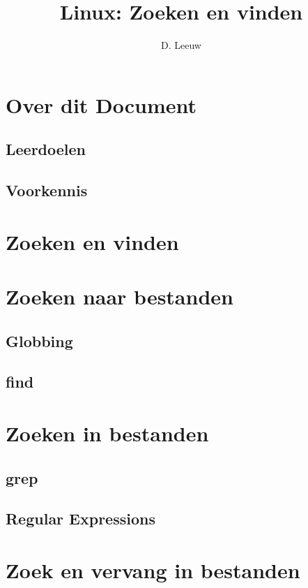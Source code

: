 \documentclass[a4paper,12pt,twoside,openright,titlepage]{article}
\author{D. Leeuw}
\title{Linux: Zoeken en vinden}
\date{\today\\
1.1.0\\
\vfill
\raggedright
\copyright\ 2020-2026 Dennis Leeuw\\
}
\begin{document}

\maketitle


\section{Over dit Document}
\subsection{Leerdoelen}

\subsection{Voorkennis}



\section{Zoeken en vinden}\label{zoekenenvinden}


\section{Zoeken naar bestanden}
\subsection{Globbing}

\subsection{find}



\section{Zoeken in bestanden}

\subsection{grep}

\subsection{Regular Expressions}


\section{Zoek en vervang in bestanden}


\printindex
\end{document}
